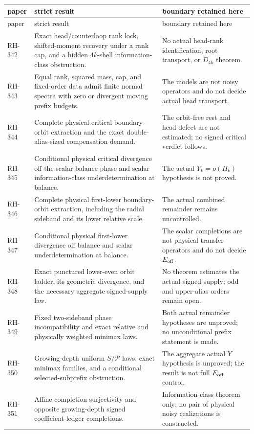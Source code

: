 \documentclass[11pt]{article}
\theoremstyle{definition}
\theoremstyle{remark}
\newcommand{\cP}{\mathcal P}
\begin{document}
\begin{longtable}{@{}>{\raggedright\arraybackslash}p{}
>{\raggedright\arraybackslash}p{}
>{\raggedright\arraybackslash}p{}@{}}
\toprule
paper & strict result & boundary retained here\\
\midrule
\endfirsthead
\toprule
paper & strict result & boundary retained here\\
\midrule
\endhead
RH-342 & Exact head/counterloop rank lock, shifted-moment recovery under a
rank cap, and a hidden $4k$-shell information-class obstruction. & No actual
head-rank identification, root transport, or $D_{4k}$ theorem.\\
RH-343 & Equal rank, squared mass, cap, and fixed-order data admit finite
normal spectra with zero or divergent moving prefix budgets. & The models
are not noisy operators and do not decide actual head transport.\\
RH-344 & Complete physical critical boundary-orbit extraction and the exact
double-alias-sized compensation demand. & The orbit-free rest and head
defect are not estimated; no signed critical verdict follows.\\
RH-345 & Conditional physical critical divergence off the scalar balance
phase and scalar information-class underdetermination at balance. & The
actual $Y_k=o(H_k)$ hypothesis is not proved.\\
RH-346 & Complete physical first-lower boundary-orbit extraction, including
the radial sideband and its lower relative scale. & The actual combined
remainder remains uncontrolled.\\
RH-347 & Conditional physical first-lower divergence off balance and scalar
underdetermination at balance. & The scalar completions are not physical
transfer operators and do not decide $E_{\rm off}$.\\
RH-348 & Exact punctured lower-even orbit ladder, its geometric divergence,
and the necessary aggregate signed-supply law. & No theorem estimates the
actual signed supply; odd and upper-alias orders remain open.\\
RH-349 & Fixed two-sideband phase incompatibility and exact relative and
physically weighted minimax laws. & Both actual remainder hypotheses are
unproved; no unconditional prefix statement is made.\\
RH-350 & Growing-depth uniform $S/\cP$ laws, exact minimax families, and a
conditional selected-subprefix obstruction. & The aggregate actual $Y$
hypothesis is unproved; the result is not full $E_{\rm off}$ control.\\
RH-351 & Affine completion surjectivity and opposite growing-depth signed
coefficient-ledger completions. & Information-class theorem only; no pair of
physical noisy realizations is constructed.\\
\bottomrule
\end{longtable}
\end{document}
